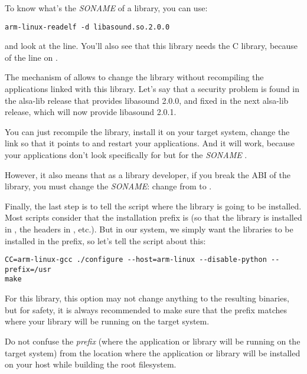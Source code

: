To know what's the {\em SONAME} of a library, you can use:
\begin{verbatim}
arm-linux-readelf -d libasound.so.2.0.0
\end{verbatim}

and look at the  line. You'll also see that this
library needs the C library, because of the  line on
.

The mechanism of  allows to change the library without
recompiling the applications linked with this library. Let's say that
a security problem is found in the alsa-lib release that provides
libasound 2.0.0, and fixed in the next alsa-lib release, which will
now provide libasound 2.0.1.

You can just recompile the library, install it on your target system,
change the  link so that it points to
 and restart your applications. And it will
work, because your applications don't look specifically for
 but for the {\em SONAME}
.

However, it also means that as a library developer, if you break the
ABI of the library, you must change the {\em SONAME}: change from
 to .

Finally, the last step is to tell the  script where the
library is going to be installed. Most  scripts consider that
the installation prefix is  (so that the library is
installed in , the headers in
, etc.). But in our system, we simply want
the libraries to be installed in the  prefix, so let's tell
the  script about this:

\begin{verbatim}
CC=arm-linux-gcc ./configure --host=arm-linux --disable-python --prefix=/usr
make
\end{verbatim}

For this library, this option may not change anything to the resulting
binaries, but for safety, it is always recommended to make sure that
the prefix matches where your library will be running on the target
system.

Do not confuse the {\em prefix} (where the application or library will
be running on the target system) from the location where the
application or library will be installed on your host while building
the root filesystem.

